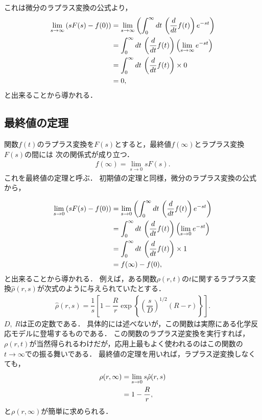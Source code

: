 これは微分のラプラス変換の公式より，
\begin{align}
  \lim_{s\to\infty}\left(sF(s)-f(0)\right)
  &=\lim_{s\to\infty}\left(\int_{0}^{\infty}dt\,\left(\dfrac{d}{dt}f(t)\right)e^{-st}\right) \notag \\
  &=\int_{0}^{\infty}dt\,\left(\dfrac{d}{dt}f(t)\right)\left(\lim_{s\to \infty}e^{-st}\right) \notag \\
  &= \int_{0}^{\infty}dt\,\left(\dfrac{d}{dt}f(t)\right)\times 0 \notag \\
  &=0,
\end{align}
と出来ることから導かれる．
%
\subsection{最終値の定理}
%
関数$f(t)$のラプラス変換を$F(s)$とすると，最終値$f(\infty)$とラプラス変換$F(s)$の間には
次の関係式が成り立つ．
\begin{align}
 f(\infty) = \lim_{s\to 0}sF(s). 
\end{align}
これを最終値の定理と呼ぶ．
初期値の定理と同様，微分のラプラス変換の公式から，

\begin{align}
  \lim_{s\to0}\left(sF(s)-f(0)\right)
  &=\lim_{s\to 0}\left(\int_{0}^{\infty}dt\,\left(\dfrac{d}{dt}f(t)\right)e^{-st}\right) \notag \\
  &=\int_{0}^{\infty}dt\,\left(\dfrac{d}{dt}f(t)\right)\left(\lim_{s\to 0}e^{-st}\right) \notag \\
  &= \int_{0}^{\infty}dt\,\left(\dfrac{d}{dt}f(t)\right)\times 1 \notag \\
  &=f(\infty)-f(0),
\end{align}
と出来ることから導かれる．
%
%
例えば，ある関数$\rho(r,t)$の$t$に関するラプラス変換$\hat{\rho}(r,s)$が次式のように与えられていたとする．
\begin{align}
 \hat{\rho}(r,s) = \dfrac{1}{s}\left[1-\dfrac{R}{r}\exp\left\{\left(\dfrac{s}{D}\right)^{1/2}(R-r)\right\}\right]. 
\end{align}
$D,~R$は正の定数である．
具体的には述べないが，この関数は実際にある化学反応モデルに登場するものである．
この関数のラプラス逆変換を実行すれば，$\rho(r,t)$が当然得られるわけだが，応用上最もよく使われるのはこの関数の
$t\to \infty$での振る舞いである．
最終値の定理を用いれば，ラプラス逆変換しなくても，
\begin{align}
 \rho(r,\infty) 
  & = \lim_{s\to 0} s\hat{\rho}(r,s) \notag \\
  & = 1- \dfrac{R}{r}, 
\end{align}
と$\rho(r,\infty)$が簡単に求められる．


